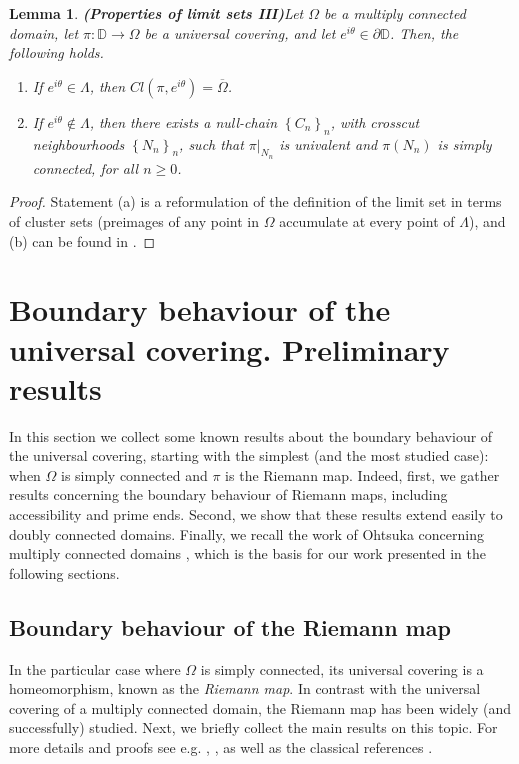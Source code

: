 \documentclass[11pt,a4paper,reqno]{amsart}
\theoremstyle{plain}
\newtheorem{lemma}[thm]{Lemma}
\theoremstyle{definition}
\theoremstyle{plain}
\begin{document}
\begin{lemma}{\bf (Properties of limit sets III)}\label{lemma-limit-sets3}
	Let $ \Omega $ be a multiply connected domain, let $ \pi\colon \mathbb{D}\to\Omega $ be a universal covering, and let $ e^{i\theta} \in\partial\mathbb{D}$. Then, the following holds.
	\begin{enumerate}[label={\em (\alph*)}]
		\item If $ e^{i\theta}\in\Lambda $, then $ Cl(\pi, e^{i\theta}) =\overline{\Omega}$.
		\item  If $ e^{i\theta}\notin\Lambda $, then there exists a null-chain $ \left\lbrace C_n\right\rbrace _n $, with crosscut neighbourhoods $  \left\lbrace N_n\right\rbrace _n$, such that $ \pi|_{N_n} $ is univalent and $ \pi(N_n) $ is simply connected, for all $ n\geq 0 $.
	\end{enumerate}
\end{lemma}
\begin{proof}
Statement	(a) is a reformulation of the definition of the limit set in terms of cluster sets (preimages of any point in $ \Omega $ accumulate at every point of $ \Lambda $), and (b) can be found in \cite[Thm. 3.5]{Oht51}.
\end{proof}

\section{Boundary behaviour of the universal covering. Preliminary results}\label{section-prelimnary-universal-covering}

In this section we collect some known results about the  boundary behaviour of the universal covering, starting with the simplest (and the most studied case): when $ \Omega $ is simply connected and $ \pi $ is the Riemann map. Indeed, first, we gather results concerning the boundary behaviour of Riemann maps, including accessibility and prime ends. Second, we show that these results extend easily to doubly connected domains. Finally, we recall the work of Ohtsuka concerning multiply connected domains \cite{Oht54}, which is the basis for our work presented in the following sections.
\subsection{Boundary behaviour of the Riemann map}\label{subsect-Riemann-map}

In the particular case where $ \Omega $ is simply connected, its universal covering is a homeomorphism, known as the {\em Riemann map}. In contrast with the universal covering of a multiply connected domain, the Riemann map has been widely (and successfully) studied. Next, we briefly collect the main results on this topic. For more details and proofs see e.g. \cite[Sect. 17]{Milnor}, \cite[Chap. 2]{Pom92}, as well as the classical references \cite{Noshiro-clustersets,Collingwood-Lohwater}.
\end{document}
